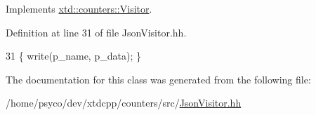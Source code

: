 Implements \hyperlink{classxtd_1_1counters_1_1Visitor_aba895c10dd1a28fa7a8b64e61adee5ac}{xtd\+::counters\+::\+Visitor}.



Definition at line 31 of file Json\+Visitor.\+hh.


\begin{DoxyCode}
31 \{ write(p\_name, p\_data); \}
\end{DoxyCode}


The documentation for this class was generated from the following file\+:\begin{DoxyCompactItemize}
\item 
/home/psyco/dev/xtdcpp/counters/src/\hyperlink{JsonVisitor_8hh}{Json\+Visitor.\+hh}\end{DoxyCompactItemize}
